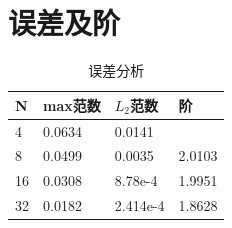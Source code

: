 \documentclass[12pt,a4paper]{article}
\begin{document}
\section{误差及阶}
\begin{table}
	\centering  
	\caption{误差分析}  
	\begin{tabular*}{8cm}{llll}  
		\hline  
		N & max范数  & $L_2$范数 &阶\\  
		\hline  
		4  & 0.0634 & 0.0141 & \ \\  
		8  & 0.0499 & 0.0035 & 2.0103\\
		16  & 0.0308 & 8.78e-4& 1.9951 \\
		32  & 0.0182 & 2.414e-4 &1.8628\\  
		\hline  
	\end{tabular*}  
\end{table}
\end{document}

